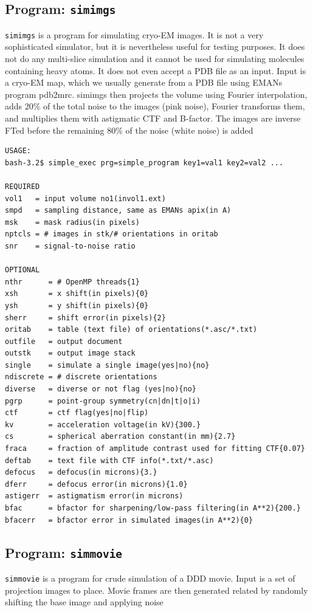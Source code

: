 \documentclass[a4paper,11pt]{article}
\newcommand{\prgname}[1]{\textcolor{NavyBlue}{\texttt{#1}}}
\begin{document}
\subsection{Program: \prgname{simimgs}}
\label{simimgs}
\prgname{simimgs} is a program for simulating cryo-EM images. It is not a very sophisticated simulator, but it is nevertheless useful for testing purposes. It does not do any multi-slice simulation and it cannot be used for simulating molecules containing heavy atoms. It does not even accept a PDB file as an input. Input is a cryo-EM map, which we usually generate from a PDB file using EMANs program pdb2mrc. simimgs then projects the volume using Fourier interpolation, adds 20\% of the total noise to the images (pink noise), Fourier transforms them, and multiplies them with astigmatic CTF and B-factor. The images are inverse FTed before the remaining 80\% of the noise (white noise) is added

\begin{verbatim}
USAGE:
bash-3.2$ simple_exec prg=simple_program key1=val1 key2=val2 ...

REQUIRED
vol1   = input volume no1(invol1.ext)
smpd   = sampling distance, same as EMANs apix(in A)
msk    = mask radius(in pixels)
nptcls = # images in stk/# orientations in oritab
snr    = signal-to-noise ratio

OPTIONAL
nthr      = # OpenMP threads{1}
xsh       = x shift(in pixels){0}
ysh       = y shift(in pixels){0}
sherr     = shift error(in pixels){2}
oritab    = table (text file) of orientations(*.asc/*.txt)
outfile   = output document
outstk    = output image stack
single    = simulate a single image(yes|no){no}
ndiscrete = # discrete orientations
diverse   = diverse or not flag (yes|no){no}
pgrp      = point-group symmetry(cn|dn|t|o|i)
ctf       = ctf flag(yes|no|flip)
kv        = acceleration voltage(in kV){300.}
cs        = spherical aberration constant(in mm){2.7}
fraca     = fraction of amplitude contrast used for fitting CTF{0.07}
deftab    = text file with CTF info(*.txt/*.asc)
defocus   = defocus(in microns){3.}
dferr     = defocus error(in microns){1.0}
astigerr  = astigmatism error(in microns)
bfac      = bfactor for sharpening/low-pass filtering(in A**2){200.}
bfacerr   = bfactor error in simulated images(in A**2){0}
\end{verbatim}

\subsection{Program: \prgname{simmovie}}
\label{simmovie}
\prgname{simmovie} is a program for crude simulation of a DDD movie. Input is a set of projection images to place. Movie frames are then generated related by randomly shifting the base image and applying noise
\end{document}
